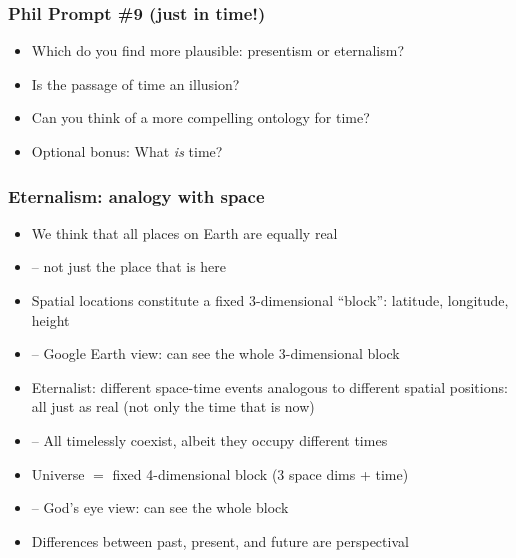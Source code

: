 \begin{frame}
\frametitle{Phil Prompt \#9 (just in time!)}

\begin{itemize}[<+->]

\item Which do you find more plausible: presentism or eternalism?

\item Is the passage of time an illusion? 

\item Can you think of a more compelling ontology for time?

\item Optional bonus: What \textit{is} time? 

\end{itemize}
\end{frame}

\begin{frame}
\frametitle{Eternalism: analogy with space}

\begin{itemize}[<+->]

\item We think that all places on Earth are equally real 
\item[] -- not just the place that is here
\item Spatial locations constitute a fixed 3-dimensional “block”:  latitude, longitude, height
\item[] -- Google Earth view: can see the whole 3-dimensional block

\item Eternalist: different space-time events analogous to different spatial positions: all just as real (not only the time that is now)
\item[] -- All timelessly coexist, albeit they occupy different times 
\item Universe $=$ fixed 4-dimensional block (3 space dims + time)
\item[] -- God’s eye view: can see the whole block
\item Differences between past, present, and future are perspectival

\end{itemize}
\end{frame}

